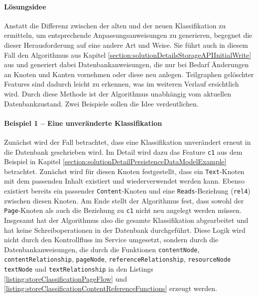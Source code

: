     \paragraph{Lösungsidee}
    Anstatt die Differenz zwischen der alten und der neuen Klassifikation zu ermitteln,
    um entsprechende Anpassungsanweisungen zu generieren,
    begegnet die {\classificationStorageAPI} dieser Herausforderung auf eine andere Art und Weise.
    Sie führt auch in diesem Fall den Algorithmus aus Kapitel \ref{section:solutionDetailsStorageAPIInitialWrite}
    aus und generiert dabei Datenbankanweisungen,
    die nur bei Bedarf Änderungen an Knoten und Kanten vornehmen oder diese neu anlegen.
    Teilgraphen gelöschter Features sind dadurch leicht zu erkennen,
    was im weiteren Verlauf ersichtlich wird.
    Durch diese Methode ist der Algorithmus unabhängig vom aktuellen Datenbankzustand.
    Zwei Beispiele sollen die Idee verdeutlichen.

    \paragraph{Beispiel 1 -- Eine unveränderte Klassifikation}
    Zunächst wird der Fall betrachtet, dass eine Klassifikation unverändert erneut in die Datenbank geschrieben wird.
    Im Detail wird dazu das Feature \texttt{c1} aus dem Beispiel in Kapitel
    \ref{section:solutionDetailPersistenceDataModelExample} betrachtet.
    Zunächst wird für diesen Knoten festgestellt,
    dass ein \texttt{Text}-Knoten mit dem passenden Inhalt existiert und wiederverwendet werden kann.
    Ebenso existiert bereits ein passender \texttt{Content}-Knoten und eine \texttt{Reads}-Beziehung (\texttt{rel4}) zwischen diesen Knoten.
    Am Ende stellt der Algorithmus fest, dass sowohl der \texttt{Page}-Knoten als auch
    die Beziehung zu \texttt{c1} nicht neu angelegt werden müssen.
    Insgesamt hat der Algorithmus also die gesamte Klassifikation abgearbeitet
    und hat keine Schreiboperationen in der Datenbank durchgeführt.
    Diese Logik wird nicht durch den Kontrollfluss im Service umgesetzt,
    sondern durch die Datenbankanweisungen, die durch die Funktionen
    \texttt{contentNode},
    \texttt{contentRelationship},
    \texttt{pageNode},
    \texttt{referenceRelationship},
    \texttt{resourceNode}
    \texttt{textNode} und
    \texttt{textRelationship} in den Listings
    \ref{listing:storeClassificationPageFlow} und
    \ref{listing:storeClassificationContentReferenceFunctions}
    erzeugt werden.

